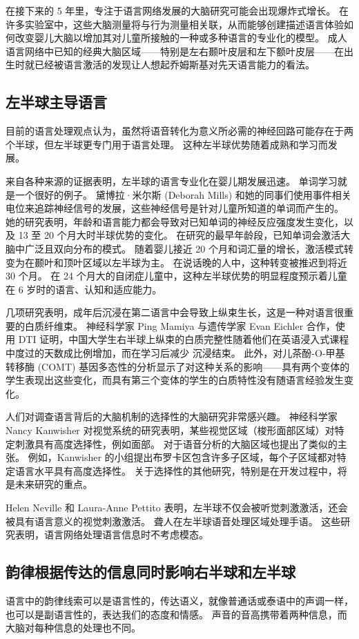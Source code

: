 在接下来的 5 年里，专注于语言网络发展的大脑研究可能会出现爆炸式增长。 在许多实验室中，这些大脑测量将与行为测量相关联，从而能够创建描述语言体验如何改变婴儿大脑以增加其对儿童所接触的一种或多种语言的专业化的模型。 成人语言网络中已知的经典大脑区域——特别是左右颞叶皮层和左下额叶皮层——在出生时就已经被语言激活的发现让人想起乔姆斯基对先天语言能力的看法。

\subsection{左半球主导语言}
目前的语言处理观点认为，虽然将语音转化为意义所必需的神经回路可能存在于两个半球，但左半球更专门用于语言处理。 这种左半球优势随着成熟和学习而发展。

来自各种来源的证据表明，左半球的语言专业化在婴儿期发展迅速。 单词学习就是一个很好的例子。 黛博拉·米尔斯 (Deborah Mills) 和她的同事们使用事件相关电位来追踪神经信号的发展，这些神经信号是针对儿童所知道的单词而产生的。 她的研究表明，年龄和语言能力都会导致对已知单词的神经反应强度发生变化，以及 13 至 20 个月大时半球优势的变化。 在研究的最早年龄段，已知单词会激活大脑中广泛且双向分布的模式。 随着婴儿接近 20 个月和词汇量的增长，激活模式转变为在颞叶和顶叶区域以左半球为主。 在说话晚的人中，这种转变被推迟到将近 30 个月。 在 24 个月大的自闭症儿童中，这种左半球优势的明显程度预示着儿童在 6 岁时的语言、认知和适应能力。

几项研究表明，成年后沉浸在第二语言中会导致上纵束生长，这是一种对语言很重要的白质纤维束。 神经科学家 Ping Mamiya 与遗传学家 Evan Eichler 合作，使用 DTI 证明，中国大学生右半球上纵束的白质完整性随着他们在英语浸入式课程中度过的天数成比例增加，而在学习后减少 沉浸结束。 此外，对儿茶酚-O-甲基转移酶 (COMT) 基因多态性的分析显示了对这种关系的影响——具有两个变体的学生表现出这些变化，而具有第三个变体的学生的白质特性没有随语言经验发生变化。

人们对调查语言背后的大脑机制的选择性的大脑研究非常感兴趣。 神经科学家 Nancy Kanwisher 对视觉系统的研究表明，某些视觉区域（梭形面部区域）对特定刺激具有高度选择性，例如面部。 对于语音分析的大脑区域也提出了类似的主张。 例如，Kanwisher 的小组提出布罗卡区包含许多子区域，每个子区域都对特定语言水平具有高度选择性。 关于选择性的其他研究，特别是在开发过程中，将是未来研究的重点。

Helen Neville 和 Laura-Anne Pettito 表明，左半球不仅会被听觉刺激激活，还会被具有语言意义的视觉刺激激活。 聋人在左半球语音处理区域处理手语。 这些研究表明，语言网络处理语言信息时不考虑模态。

\subsection{韵律根据传达的信息同时影响右半球和左半球}
语言中的韵律线索可以是语言性的，传达语义，就像普通话或泰语中的声调一样，也可以是副语言性的，表达我们的态度和情感。 声音的音高携带着两种信息，而大脑对每种信息的处理也不同。

